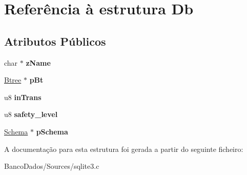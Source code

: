 \hypertarget{struct_db}{\section{Referência à estrutura Db}
\label{struct_db}
}
\subsection*{Atributos Públicos}
\begin{DoxyCompactItemize}
\item 
\hypertarget{struct_db_a6df2b5d7c8fd68e92cea961d9e3b279b}{char $\ast$ {\bfseries z\-Name}}\label{struct_db_a6df2b5d7c8fd68e92cea961d9e3b279b}

\item 
\hypertarget{struct_db_a0633e5a6abfc39246d07cc6a417a5852}{\hyperlink{struct_btree}{Btree} $\ast$ {\bfseries p\-Bt}}\label{struct_db_a0633e5a6abfc39246d07cc6a417a5852}

\item 
\hypertarget{struct_db_a4c5495ebea317212f0b41aa2795a7bc9}{u8 {\bfseries in\-Trans}}\label{struct_db_a4c5495ebea317212f0b41aa2795a7bc9}

\item 
\hypertarget{struct_db_a04597a5c023d8b328193450b177ff24c}{u8 {\bfseries safety\-\_\-level}}\label{struct_db_a04597a5c023d8b328193450b177ff24c}

\item 
\hypertarget{struct_db_afd8647a83a4a7053231b92814520d6d4}{\hyperlink{struct_schema}{Schema} $\ast$ {\bfseries p\-Schema}}\label{struct_db_afd8647a83a4a7053231b92814520d6d4}

\end{DoxyCompactItemize}


A documentação para esta estrutura foi gerada a partir do seguinte ficheiro\-:\begin{DoxyCompactItemize}
\item 
Banco\-Dados/\-Sources/sqlite3.\-c\end{DoxyCompactItemize}
